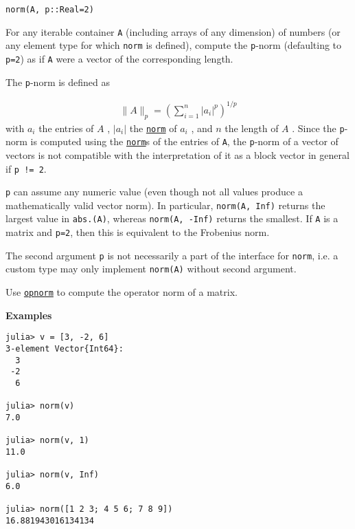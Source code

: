 \begin{adjustwidth}{2em}{0pt}


\begin{verbatim}
norm(A, p::Real=2)
\end{verbatim}

For any iterable container \texttt{A} (including arrays of any dimension) of numbers (or any element type for which \texttt{norm} is defined), compute the \texttt{p}-norm (defaulting to \texttt{p=2}) as if \texttt{A} were a vector of the corresponding length.

The \texttt{p}-norm is defined as

\begin{equation*}
\begin{split}\|A\|_p = \left( \sum_{i=1}^n | a_i | ^p \right)^{1/p}\end{split}\end{equation*}
with  \(a_i\)  the entries of  \(A\) ,  \(| a_i |\)  the \hyperlink{898926013064269707}{\texttt{norm}} of  \(a_i\) , and  \(n\)  the length of  \(A\) . Since the \texttt{p}-norm is computed using the \hyperlink{898926013064269707}{\texttt{norm}}s of the entries of \texttt{A}, the \texttt{p}-norm of a vector of vectors is not compatible with the interpretation of it as a block vector in general if \texttt{p != 2}.

\texttt{p} can assume any numeric value (even though not all values produce a mathematically valid vector norm). In particular, \texttt{norm(A, Inf)} returns the largest value in \texttt{abs.(A)}, whereas \texttt{norm(A, -Inf)} returns the smallest. If \texttt{A} is a matrix and \texttt{p=2}, then this is equivalent to the Frobenius norm.

The second argument \texttt{p} is not necessarily a part of the interface for \texttt{norm}, i.e. a custom type may only implement \texttt{norm(A)} without second argument.

Use \hyperlink{4740175223212326101}{\texttt{opnorm}} to compute the operator norm of a matrix.

\textbf{Examples}


\begin{verbatim}
julia> v = [3, -2, 6]
3-element Vector{Int64}:
  3
 -2
  6

julia> norm(v)
7.0

julia> norm(v, 1)
11.0

julia> norm(v, Inf)
6.0

julia> norm([1 2 3; 4 5 6; 7 8 9])
16.881943016134134


\end{verbatim}
\end{adjustwidth}
